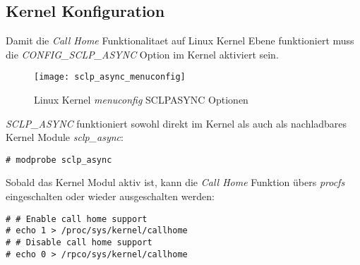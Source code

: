 \subsection{Kernel Konfiguration}

Damit die \textit{Call Home} Funktionalitaet auf Linux Kernel Ebene funktioniert muss die \textit{CONFIG\_SCLP\_ASYNC} Option im Kernel aktiviert sein.

\begin{figure}[h!]
\centering
\texttt{[image: sclp\_async\_menuconfig]}
\caption{Linux Kernel \textit{menuconfig} SCLP\textunderscore ASYNC Optionen}
\label{fig:SCLPASYNC}
\end{figure}

\textit{SCLP\_ASYNC} funktioniert sowohl direkt im Kernel als auch als nachladbares Kernel Module \textit{sclp\_async}:

\begin{lstlisting}
# modprobe sclp_async
\end{lstlisting}

Sobald das Kernel Modul aktiv ist, kann die \textit{Call Home} Funktion übers \textit{procfs} eingeschalten oder wieder ausgeschalten werden:\cite{IBMCallHome}

\begin{lstlisting}
# # Enable call home support
# echo 1 > /proc/sys/kernel/callhome
# # Disable call home support
# echo 0 > /rpco/sys/kernel/callhome
\end{lstlisting}
